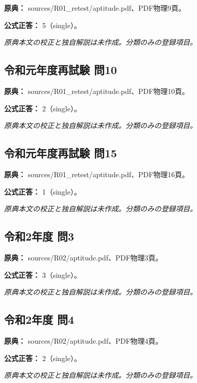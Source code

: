 \noindent\textbf{原典：} sources/R01\_retest/aptitude.pdf、PDF物理9頁。

\textbf{公式正答：} 5（single）。

\par\textit{原典本文の校正と独自解説は未作成。分類のみの登録項目。}

\subsection{令和元年度再試験 問10}
\label{q:r01-ret-apt-10}

\noindent\textbf{原典：} sources/R01\_retest/aptitude.pdf、PDF物理10頁。

\textbf{公式正答：} 2（single）。

\par\textit{原典本文の校正と独自解説は未作成。分類のみの登録項目。}

\subsection{令和元年度再試験 問15}
\label{q:r01-ret-apt-15}

\noindent\textbf{原典：} sources/R01\_retest/aptitude.pdf、PDF物理16頁。

\textbf{公式正答：} 1（single）。

\par\textit{原典本文の校正と独自解説は未作成。分類のみの登録項目。}

\subsection{令和2年度 問3}
\label{q:r02-reg-apt-03}

\noindent\textbf{原典：} sources/R02/aptitude.pdf、PDF物理3頁。

\textbf{公式正答：} 3（single）。

\par\textit{原典本文の校正と独自解説は未作成。分類のみの登録項目。}

\subsection{令和2年度 問4}
\label{q:r02-reg-apt-04}

\noindent\textbf{原典：} sources/R02/aptitude.pdf、PDF物理4頁。

\textbf{公式正答：} 2（single）。

\par\textit{原典本文の校正と独自解説は未作成。分類のみの登録項目。}

